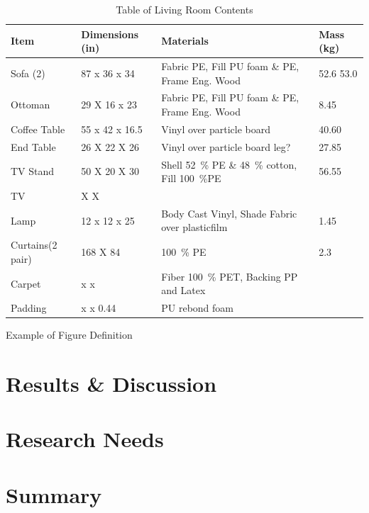 \documentclass[12pt,oneside]{book}
\begin{document}
\begin{table}[!ht]
	\centering
	\caption{Table of Living Room Contents}
	\label{tab:BRFuel}
	\begin{tabular}{llll}
		\toprule[1.5pt]
		Item 				& Dimensions (in) 	& Materials 										& Mass (kg)  \\
		\midrule
		Sofa (2) 		  	& 87 x 36 x 34  	& Fabric PE, Fill PU foam \& PE, Frame Eng. Wood	& 52.6 53.0      \\
		Ottoman     		& 29 X 16 x 23 		& Fabric PE, Fill PU foam \& PE, Frame Eng. Wood   	& 8.45       \\
		Coffee Table   		& 55 x 42 x 16.5	& Vinyl over particle board  						& 40.60     \\
		End Table      		& 26 X 22 X 26 		& Vinyl over particle board  leg? 					& 27.85     \\	
		TV Stand	 		& 50 X 20 X 30 		& Shell 52~\% PE \& 48~\% cotton, Fill 100~\%PE 	& 56.55   \\	
		TV 					&    X    X 		& 										  			&         \\
		Lamp 				& 12 x 12 x 25		& Body Cast Vinyl, Shade Fabric over plasticfilm	& 1.45  \\
		Curtains(2 pair) 	& 168 X 84 			& 100~\% PE 										& 2.3   \\
		Carpet				&  x  x 			& Fiber 100~\% PET, Backing PP and Latex			&  \\
		Padding				&  x  x 0.44		& PU rebond foam									& 	\\
		\bottomrule[1.25pt]
	\end{tabular}
\end{table}



Example of Figure Definition



\chapter{Results \& Discussion}



\chapter{Research Needs}


\chapter{Summary}




\clearpage

\appendix
\captionsetup{list=no}
\end{document}
